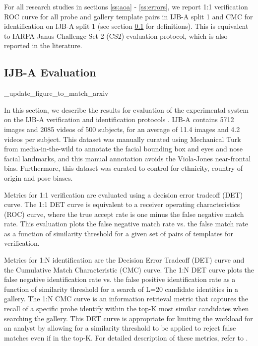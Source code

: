 \documentclass[10pt,twocolumn,letterpaper]{article}
\theoremstyle{definition}		\newtheorem{defn}[thm]{Definition}
\begin{document}
For all research studies in sections \ref{ss:aoa} - \ref{ss:errors}, we report 1:1 verification ROC curve for all probe and gallery template pairs in IJB-A split 1 and CMC for identification on IJB-A split 1 (see section \ref{ss:ijba_evaluation} for definitions).   This is equivalent to IARPA Janus Challenge Set 2 (CS2) evaluation protocol, which is also reported in the literature.     


\subsection{IJB-A Evaluation}
\label{ss:ijba_evaluation}

\ifdefined\ECCV

\fixme_update_figure_to_match_arxiv
\fi




In this section, we describe the results for evaluation of the experimental system on the IJB-A verification and identification protocols \cite{Klare15}. IJB-A contains 5712 images and 2085 videos of 500 subjects, for an average of 11.4 images and 4.2 videos per subject.  This dataset was manually curated using Mechanical Turk from media-in-the-wild to annotate the facial bounding box and eyes and nose facial landmarks, and this manual annotation avoids the Viola-Jones near-frontal bias. Furthermore, this dataset was curated to control for ethnicity, country of origin and pose biases.

Metrics for 1:1 verification are evaluated using a decision error tradeoff (DET) curve.  The 1:1 DET curve is equivalent to a receiver operating characteristics (ROC) curve, where the true accept rate is one minus the false negative match rate.   
This evaluation plots the false negative match rate vs. the false match rate as a function of similarity threshold for a given set of pairs of templates for verification.  


Metrics for 1:N identification are the Decision Error Tradeoff (DET) curve and the Cumulative Match Characteristic (CMC) curve.  The 1:N DET curve plots the false negative identification rate vs. the false positive identification rate as a function of similarity threshold for a search of L=20 candidate identities in a gallery.  The 1:N CMC curve is an information retrieval metric that captures the recall of a specific probe identify within the top-K most similar candidates when searching the gallery.  
This DET curve is appropriate for limiting the workload for an analyst by allowing for a similarity threshold to be applied to reject false matches even if in the top-K.  For detailed description of these metrics, refer to \cite{Klare15,Grother14}.
\end{document}

